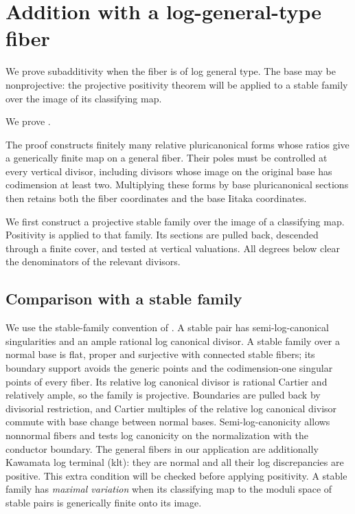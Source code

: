 \section{Addition with a log-general-type fiber}\label{generaltype:section}

We prove subadditivity when the fiber is of log general type.  The base
may be nonprojective: the projective positivity theorem will be applied
to a stable family over the image of its classifying map.

We prove .

The proof constructs finitely many relative pluricanonical forms whose
ratios give a generically finite map on a general fiber.  Their poles
must be controlled at every vertical divisor, including divisors whose
image on the original base has codimension at least two.  Multiplying
these forms by base pluricanonical sections then retains both the fiber
coordinates and the base Iitaka coordinates.

We first construct a projective stable family over the image of a
classifying map.  Positivity is applied to that family.  Its sections
are pulled back, descended through a finite cover, and tested at
vertical valuations.  All degrees below clear the denominators of the
relevant divisors.

\subsection{Comparison with a stable family}

We use the stable-family convention of
\cite[Notation~3.7, Remark~3.8, and Definitions~3.9 and~3.11]
{KovacsPatakfalvi}. A stable pair has semi-log-canonical singularities
and an ample rational log canonical divisor. A stable family over a
normal base is flat, proper and surjective with connected stable
fibers; its boundary support avoids the generic points and the
codimension-one singular points of every fiber. Its relative log
canonical divisor is rational Cartier and relatively ample, so the
family is projective. Boundaries are pulled
back by divisorial restriction, and Cartier multiples of the relative
log canonical divisor commute with base change between normal bases.
Semi-log-canonicity
allows nonnormal fibers and tests log canonicity on the normalization
with the conductor boundary. The general fibers in our application
are additionally Kawamata log terminal (klt): they are normal and
all their log discrepancies are positive. This extra condition will
be checked before applying positivity.
A stable family has \emph{maximal variation} when its classifying map
to the moduli space of stable pairs is generically finite onto its image.

